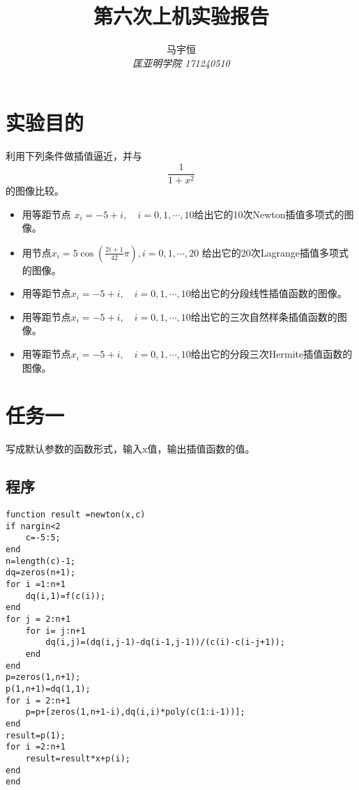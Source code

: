 \documentclass[a4paper,11pt,onecolumn,twoside]{article}
\title{\textbf{第六次上机实验报告}}
\author{
马宇恒
\\[2pt]
{\small \textit{匡亚明学院 171240510}}}
\date{}
\begin{document}
\maketitle
\thispagestyle{firststyle}
\setlength{\oddsidemargin}{ 1cm}
\setlength{\evensidemargin}{\oddsidemargin}
\setlength{\textwidth}{15.50cm}
\vspace{-.8cm}


\setcounter{page}{1}

\setlength{\oddsidemargin}{-.5cm}  %
\setlength{\evensidemargin}{\oddsidemargin}
\setlength{\textwidth}{17.00cm}

\section{实验目的}
利用下列条件做插值逼近，并与$$\frac{1}{1+x^2}$$的图像比较。
\begin{itemize}
\item 用等距节点 $x _ { i } = - 5 + i , \quad i = 0,1 , \cdots , 10$给出它的10次Newton插值多项式的图像。
\item 用节点$x _ { i } = 5 \cos \left( \frac { 2 i + 1 } { 42 } \pi \right) , i = 0,1 , \cdots , 20$ 给出它的20次Lagrange插值多项式的图像。
\item 用等距节点$x _ { i } = - 5 + i , \quad i = 0,1 , \cdots , 10$给出它的分段线性插值函数的图像。
\item 用等距节点$x _ { i } = - 5 + i , \quad i = 0,1 , \cdots , 10$给出它的三次自然样条插值函数的图像。
\item 用等距节点$x _ { i } = - 5 + i , \quad i = 0,1 , \cdots , 10$给出它的分段三次Hermite插值函数的图像。

\end{itemize}

\section{任务一}
写成默认参数的函数形式，输入x值，输出插值函数的值。
\subsection{程序}
\begin{lstlisting}
function result =newton(x,c)
if nargin<2
    c=-5:5;
end
n=length(c)-1;
dq=zeros(n+1);
for i =1:n+1
    dq(i,1)=f(c(i));
end
for j = 2:n+1
    for i= j:n+1
        dq(i,j)=(dq(i,j-1)-dq(i-1,j-1))/(c(i)-c(i-j+1));
    end
end
p=zeros(1,n+1);
p(1,n+1)=dq(1,1);
for i = 2:n+1
    p=p+[zeros(1,n+1-i),dq(i,i)*poly(c(1:i-1))];
end
result=p(1);
for i =2:n+1
    result=result*x+p(i);
end
end
\end{lstlisting}
\end{document}
